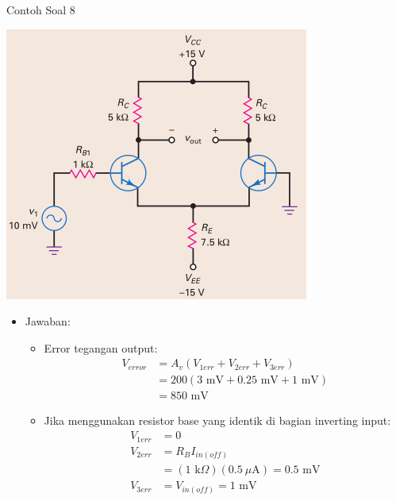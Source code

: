 \documentclass[aspectratio=169]{beamer}
\begin{document}
\begin{frame}{Contoh Soal 8}
	\begin{multicols}{2}
		\begin{center}
			\includegraphics[height=0.7\textheight]{gambar/01.diff-amp/01.latihan_soal_8}
		\end{center}
		\columnbreak
		\begin{itemize}
			\item Jawaban:
			\begin{itemize}
				\item Error tegangan output:
				\begin{align*}
					V_{error} &= A_v (V_{1err} + V_{2err} + V_{3err}) \\
					&= 200(3 \text{ mV} + 0.25 \text{ mV} + 1 \text{ mV}) \\
					&= 850 \text{ mV}
				\end{align*}
			\end{itemize}
			\begin{itemize}
				\item Jika menggunakan resistor base yang identik di bagian inverting input:
				\begin{align*}
					V_{1err} &= 0 \\
					V_{2err} &= R_{B}I_{in(off)} \\
					&= (1 \text{ k}\Omega)(0.5~\mu\text{A}) = 0.5 \text{ mV} \\
					V_{3err} &= V_{in(off)} = 1 \text{ mV}
				\end{align*}
			\end{itemize}
		\end{itemize}
	\end{multicols}
\end{frame}
\end{document}
